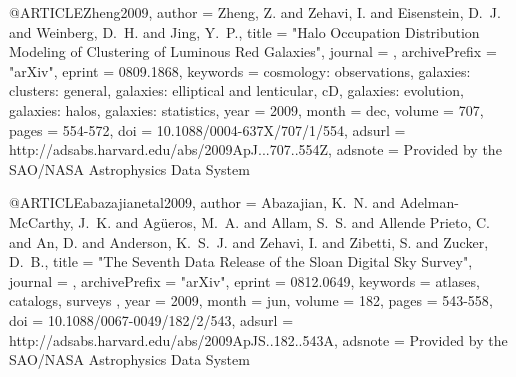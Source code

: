 @ARTICLE{Zheng2009,
   author = {{Zheng}, Z. and {Zehavi}, I. and {Eisenstein}, D.~J. and {Weinberg}, D.~H. and 
	{Jing}, Y.~P.},
    title = "{Halo Occupation Distribution Modeling of Clustering of Luminous Red Galaxies}",
  journal = {\apj},
archivePrefix = "arXiv",
   eprint = {0809.1868},
 keywords = {cosmology: observations, galaxies: clusters: general, galaxies: elliptical and lenticular, cD, galaxies: evolution, galaxies: halos, galaxies: statistics},
     year = 2009,
    month = dec,
   volume = 707,
    pages = {554-572},
      doi = {10.1088/0004-637X/707/1/554},
   adsurl = {http://adsabs.harvard.edu/abs/2009ApJ...707..554Z},
  adsnote = {Provided by the SAO/NASA Astrophysics Data System}
}



@ARTICLE{abazajianetal2009,
   author = {{Abazajian}, K.~N. and {Adelman-McCarthy}, J.~K. and {Ag{\"u}eros}, M.~A. and 
	{Allam}, S.~S. and {Allende Prieto}, C. and {An}, D. and {Anderson}, K.~S.~J. and 
	{Zehavi}, I. and {Zibetti}, S. and {Zucker}, D.~B.},
    title = "{The Seventh Data Release of the Sloan Digital Sky Survey}",
  journal = {\apjs},
archivePrefix = "arXiv",
   eprint = {0812.0649},
 keywords = {atlases, catalogs, surveys },
     year = 2009,
    month = jun,
   volume = 182,
    pages = {543-558},
      doi = {10.1088/0067-0049/182/2/543},
   adsurl = {http://adsabs.harvard.edu/abs/2009ApJS..182..543A},
  adsnote = {Provided by the SAO/NASA Astrophysics Data System}
}

